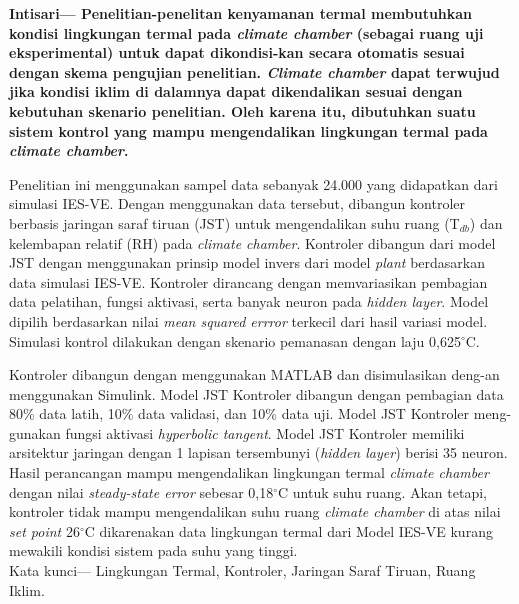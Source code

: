\documentclass[a4paper,10pt]{article}
\begin{document}
	{\setlength{\parindent}{0cm}\bfseries
		Intisari--- Penelitian-penelitan kenyamanan termal membutuhkan kondisi lingkungan termal pada \textit{climate chamber} (sebagai ruang uji eksperimental) untuk dapat dikondisi-kan secara otomatis sesuai dengan skema pengujian penelitian. \textit{Climate chamber} dapat terwujud jika kondisi iklim di dalamnya dapat dikendalikan sesuai dengan kebutuhan skenario penelitian. Oleh karena itu, dibutuhkan suatu sistem kontrol yang mampu mengendalikan lingkungan termal pada \textit{climate chamber}.
		
		\qquad Penelitian ini menggunakan sampel data sebanyak 24.000 yang didapatkan dari simulasi IES-VE. Dengan menggunakan data tersebut, dibangun kontroler berbasis jaringan saraf tiruan (JST) untuk mengendalikan suhu ruang (T$_{db}$) dan kelembapan relatif (RH) pada \textit{climate chamber}. Kontroler dibangun dari model JST dengan menggunakan prinsip model invers dari model \textit{plant} berdasarkan data simulasi IES-VE. Kontroler dirancang dengan memvariasikan pembagian data pelatihan, fungsi aktivasi, serta banyak neuron pada \textit{hidden layer}. Model dipilih berdasarkan nilai \textit{mean squared errror} terkecil dari hasil variasi model. Simulasi kontrol dilakukan dengan skenario pemanasan dengan laju 0,625$^\circ$C.
		
		\qquad Kontroler dibangun dengan menggunakan MATLAB dan disimulasikan deng-an menggunakan Simulink. Model JST Kontroler dibangun dengan pembagian data 80\% data latih, 10\% data validasi, dan 10\% data uji. Model JST Kontroler meng-gunakan fungsi aktivasi \textit{hyperbolic tangent}. Model JST Kontroler memiliki arsitektur jaringan dengan 1 lapisan tersembunyi (\textit{hidden layer}) berisi 35 neuron. Hasil perancangan mampu mengendalikan lingkungan termal \textit{climate chamber} dengan nilai \textit{steady-state error} sebesar 0,18$^\circ$C untuk suhu ruang. Akan tetapi, kontroler tidak mampu mengendalikan suhu ruang \textit{climate chamber} di atas nilai \textit{set point} 26$^\circ$C dikarenakan data lingkungan termal dari Model IES-VE kurang mewakili kondisi sistem pada suhu yang tinggi.\\
		
		Kata kunci--- Lingkungan Termal, Kontroler, Jaringan Saraf Tiruan, Ruang Iklim.
	}
	
	\vspace{0.3cm}
	
\end{document}
